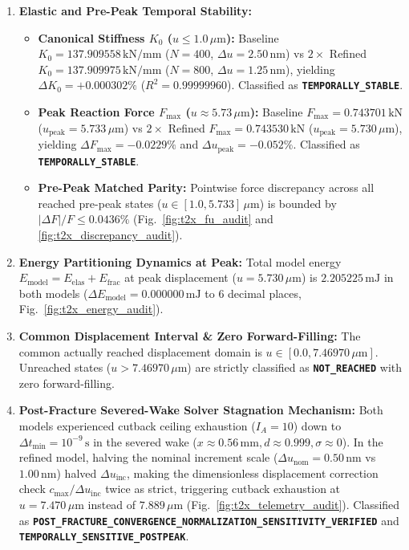 \begin{enumerate}
  \item \textbf{Elastic and Pre-Peak Temporal Stability:}
  \begin{itemize}
    \item \textbf{Canonical Stiffness $K_0$ ($u \le 1.0\,\mu\mathrm{m}$):} Baseline $K_0 = 137.909558\,\mathrm{kN/mm}$ ($N=400$, $\Delta u = 2.50\,\mathrm{nm}$) vs $2\times$ Refined $K_0 = 137.909975\,\mathrm{kN/mm}$ ($N=800$, $\Delta u = 1.25\,\mathrm{nm}$), yielding $\Delta K_0 = \mathbf{+0.000302\%}$ ($R^2 = 0.99999960$). Classified as \textbf{\texttt{TEMPORALLY\_STABLE}}.
    \item \textbf{Peak Reaction Force $F_{\max}$ ($u \approx 5.73\,\mu\mathrm{m}$):} Baseline $F_{\max} = 0.743701\,\mathrm{kN}$ ($u_{\mathrm{peak}} = 5.733\,\mu\mathrm{m}$) vs $2\times$ Refined $F_{\max} = 0.743530\,\mathrm{kN}$ ($u_{\mathrm{peak}} = 5.730\,\mu\mathrm{m}$), yielding $\Delta F_{\max} = \mathbf{-0.0229\%}$ and $\Delta u_{\mathrm{peak}} = \mathbf{-0.052\%}$. Classified as \textbf{\texttt{TEMPORALLY\_STABLE}}.
    \item \textbf{Pre-Peak Matched Parity:} Pointwise force discrepancy across all reached pre-peak states ($u \in [1.0, 5.733]\,\mu\mathrm{m}$) is bounded by $|\Delta F|/F \le \mathbf{0.0436\%}$ (Fig.~\ref{fig:t2x_fu_audit} and \ref{fig:t2x_discrepancy_audit}).
  \end{itemize}

  \item \textbf{Energy Partitioning Dynamics at Peak:}
  Total model energy $E_{\mathrm{model}} = E_{\mathrm{elas}} + E_{\mathrm{frac}}$ at peak displacement ($u = 5.730\,\mu\mathrm{m}$) is $2.205225\,\mathrm{mJ}$ in both models ($\Delta E_{\mathrm{model}} = \mathbf{0.000000\,\mathrm{mJ}}$ to 6 decimal places, Fig.~\ref{fig:t2x_energy_audit}).

  \item \textbf{Common Displacement Interval \& Zero Forward-Filling:}
  The common actually reached displacement domain is $u \in [0.0, 7.46970\,\mu\mathrm{m}]$. Unreached states ($u > 7.46970\,\mu\mathrm{m}$) are strictly classified as \textbf{\texttt{NOT\_REACHED}} with zero forward-filling.

  \item \textbf{Post-Fracture Severed-Wake Solver Stagnation Mechanism:}
  Both models experienced cutback ceiling exhaustion ($I_A=10$) down to $\Delta t_{\min} = 10^{-9}\,\mathrm{s}$ in the severed wake ($x \approx 0.56\,\mathrm{mm}, d \approx 0.999, \sigma \approx 0$). In the refined model, halving the nominal increment scale ($\Delta u_{\mathrm{nom}} = 0.50\,\mathrm{nm}$ vs $1.00\,\mathrm{nm}$) halved $\Delta u_{\mathrm{inc}}$, making the dimensionless displacement correction check $c_{\max} / \Delta u_{\mathrm{inc}}$ twice as strict, triggering cutback exhaustion at $u = 7.470\,\mu\mathrm{m}$ instead of $7.889\,\mu\mathrm{m}$ (Fig.~\ref{fig:t2x_telemetry_audit}). Classified as \textbf{\texttt{POST\_FRACTURE\_CONVERGENCE\_NORMALIZATION\_SENSITIVITY\_VERIFIED}} and \textbf{\texttt{TEMPORALLY\_SENSITIVE\_POSTPEAK}}.
\end{enumerate}


